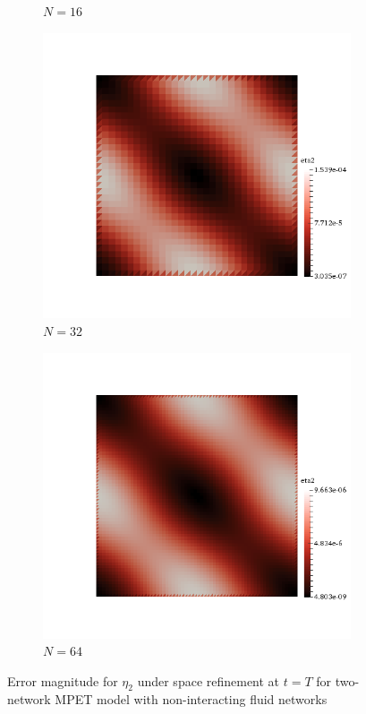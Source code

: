\begin{figure}[h!]
\begin{subfigure}[b]{0.24\textwidth}
    \caption{$N=16$}
  \end{subfigure}
  \begin{subfigure}[b]{0.24\textwidth}
    \includegraphics[width=\textwidth,height=\textheight,keepaspectratio,height=\textheight,keepaspectratio]{figures/2_mpet/no_transfer/space/eta2_32.png}
    \caption{$N=32$}
  \end{subfigure}
  \begin{subfigure}[b]{0.24\textwidth}
    \includegraphics[width=\textwidth,height=\textheight,keepaspectratio,height=\textheight,keepaspectratio]{figures/2_mpet/no_transfer/space/eta2_64.png}
    \caption{$N=64$}
  \end{subfigure}
  \caption{Error magnitude for $\eta_2$ under space refinement at $t=T$ for two-network MPET model with non-interacting fluid networks} \label{fig:bb_no_transfer_eta2}
\end{figure}

